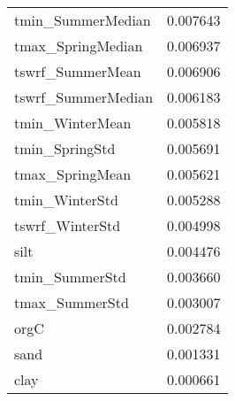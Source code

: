 \begin{tabular}{lr}
tmin_SummerMedian & 0.007643 \\
tmax_SpringMedian & 0.006937 \\
tswrf_SummerMean & 0.006906 \\
tswrf_SummerMedian & 0.006183 \\
tmin_WinterMean & 0.005818 \\
tmin_SpringStd & 0.005691 \\
tmax_SpringMean & 0.005621 \\
tmin_WinterStd & 0.005288 \\
tswrf_WinterStd & 0.004998 \\
silt & 0.004476 \\
tmin_SummerStd & 0.003660 \\
tmax_SummerStd & 0.003007 \\
orgC & 0.002784 \\
sand & 0.001331 \\
clay & 0.000661 \\
\bottomrule
\end{tabular}
